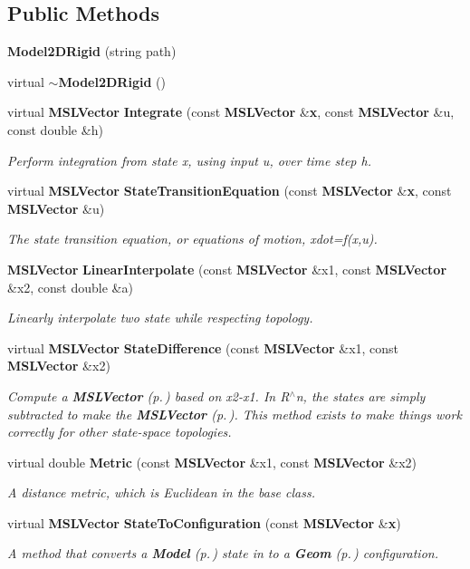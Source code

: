 \subsection*{Public Methods}
\begin{CompactItemize}
\item 
{\bf Model2DRigid} (string path)
\item 
virtual {\bf $\sim$Model2DRigid} ()
\item 
virtual {\bf MSLVector} {\bf Integrate} (const {\bf MSLVector} \&{\bf x}, const {\bf MSLVector} \&u, const double \&h)
\begin{CompactList}\small\item\em Perform integration from state x, using input u, over time step h.\item\end{CompactList}\item 
virtual {\bf MSLVector} {\bf State\-Transition\-Equation} (const {\bf MSLVector} \&{\bf x}, const {\bf MSLVector} \&u)
\begin{CompactList}\small\item\em The state transition equation, or equations of motion, xdot=f(x,u).\item\end{CompactList}\item 
{\bf MSLVector} {\bf Linear\-Interpolate} (const {\bf MSLVector} \&x1, const {\bf MSLVector} \&x2, const double \&a)
\begin{CompactList}\small\item\em Linearly interpolate two state while respecting topology.\item\end{CompactList}\item 
virtual {\bf MSLVector} {\bf State\-Difference} (const {\bf MSLVector} \&x1, const {\bf MSLVector} \&x2)
\begin{CompactList}\small\item\em Compute a {\bf MSLVector} {\rm (p.\,\pageref{classMSLVector})} based on x2-x1. In R$^\wedge$n, the states are simply subtracted to make the {\bf MSLVector} {\rm (p.\,\pageref{classMSLVector})}. This method exists to make things work correctly for other state-space topologies.\item\end{CompactList}\item 
virtual double {\bf Metric} (const {\bf MSLVector} \&x1, const {\bf MSLVector} \&x2)
\begin{CompactList}\small\item\em A distance metric, which is Euclidean in the base class.\item\end{CompactList}\item 
virtual {\bf MSLVector} {\bf State\-To\-Configuration} (const {\bf MSLVector} \&{\bf x})
\begin{CompactList}\small\item\em A method that converts a {\bf Model} {\rm (p.\,\pageref{classModel})} state in to a {\bf Geom} {\rm (p.\,\pageref{classGeom})} configuration.\item\end{CompactList}\end{CompactItemize}


